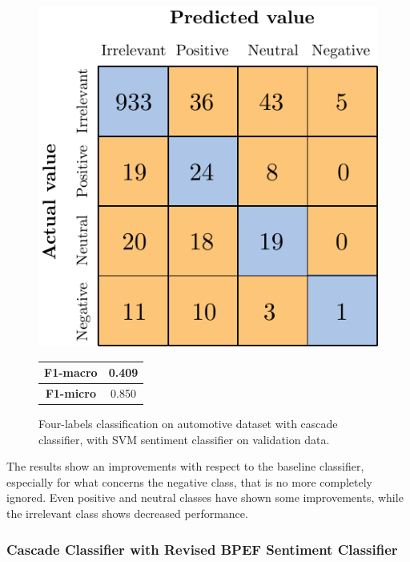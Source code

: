 \begin{figure}[H]
	\begin{minipage}[b]{0.6\linewidth}
		\centering
		\includegraphics[scale=1]{figures/conf_matrices/ita_cascade_svm/ita_cascade_svm_val.pdf}
	\end{minipage}
	\begin{minipage}[b]{0.3\linewidth}
		\begin{tabular}[b]{ | c | c | } 
			\hline
			\textbf{F1-macro} & 0.409 \\
			\hline
			\textbf{F1-micro} & 0.850 \\ 
			\hline
		\end{tabular}
	\end{minipage}
	\caption{Four-labels classification on automotive dataset with cascade classifier, with SVM sentiment classifier on validation data.}
	\label{fig:ita_cascade_svm_val}
\end{figure}


The results show an improvements with respect to the baseline classifier, especially for what concerns the negative class, that is no more completely ignored. Even positive and neutral classes have shown some improvements, while the irrelevant class shows decreased performance. 




\subsubsection{Cascade Classifier with Revised BPEF Sentiment Classifier}

